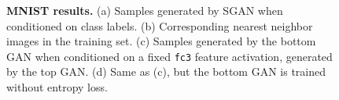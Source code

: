 \documentclass[10pt,twocolumn,letterpaper]{article}
\begin{document}
\begin{figure}[!tbp]
	\caption{{\bf MNIST results.} 
(a) Samples generated by SGAN when conditioned on class labels. (b) Corresponding nearest neighbor images in the training set. (c) Samples generated by the bottom GAN when conditioned on a fixed \texttt{fc3} feature activation, generated by the top GAN. (d) Same as (c), but the bottom GAN is trained without entropy loss.} 
	\label{fig:mnist}
	\vspace{-0.2cm}
\end{figure}



\begin{figure}[!htbp]
	\centering

\end{figure}
\end{document}
